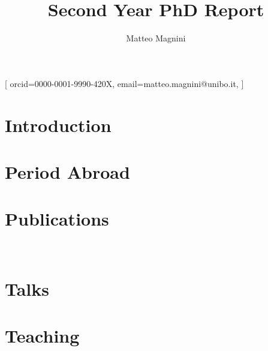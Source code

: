 \documentclass[
]{ceurart}
\begin{document}


\title{Second Year PhD Report}


\author[1]{Matteo Magnini}[%
orcid=0000-0001-9990-420X,
email=matteo.magnini@unibo.it,
]

\address[1]{Department of Computer Science and Engineering, University of Bologna, Via dell'Università 50, Cesena, Italy}



\maketitle

\section{Introduction}
\label{sec:introduction}


\section{Period Abroad}
\label{sec:period-abroad}


\section{Publications}
\label{sec:publications}

~\cite{DBLP:journals/csur/CiattoSAMO24}


\section{Talks}
\label{sec:talks}


\section{Teaching}\label{sec:results}



\end{document}
